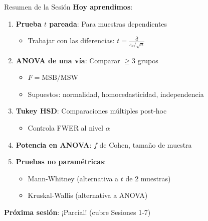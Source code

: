 \documentclass[aspectratio=169, 11pt]{beamer}
\begin{document}
\begin{frame}{Resumen de la Sesión}
\textbf{Hoy aprendimos}:
\begin{enumerate}
  \item \textbf{Prueba $t$ pareada}: Para muestras dependientes
  \begin{itemize}
    \item Trabajar con las diferencias: $t = \frac{\bar{d}}{s_d/\sqrt{n}}$
  \end{itemize}

  \item \textbf{ANOVA de una vía}: Comparar $\geq 3$ grupos
  \begin{itemize}
    \item $F = \text{MSB}/\text{MSW}$
    \item Supuestos: normalidad, homocedasticidad, independencia
  \end{itemize}

  \item \textbf{Tukey HSD}: Comparaciones múltiples post-hoc
  \begin{itemize}
    \item Controla FWER al nivel $\alpha$
  \end{itemize}

  \item \textbf{Potencia en ANOVA}: $f$ de Cohen, tamaño de muestra

  \item \textbf{Pruebas no paramétricas}:
  \begin{itemize}
    \item Mann-Whitney (alternativa a $t$ de 2 muestras)
    \item Kruskal-Wallis (alternativa a ANOVA)
  \end{itemize}
\end{enumerate}

\vspace{0.3cm}
\textbf{Próxima sesión}: ¡Parcial! (cubre Sesiones 1-7)
\end{frame}
\end{document}
